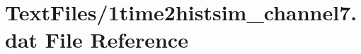 \hypertarget{1time2histsim__channel7_8dat}{}\section{Text\+Files/1time2histsim\+\_\+channel7.dat File Reference}
\label{1time2histsim__channel7_8dat}
